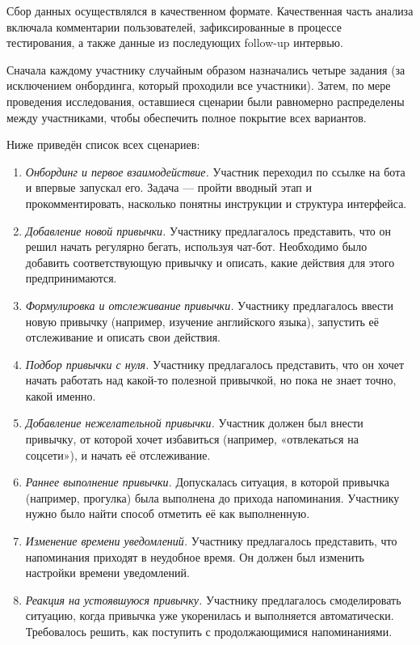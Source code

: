 \documentclass[pdflatex,sn-mathphys-num]{sn-jnl}%
\theoremstyle{thmstyleone}%
\theoremstyle{thmstyletwo}%
\theoremstyle{thmstylethree}%
\begin{document}
Сбор данных осуществлялся в качественном формате. Качественная часть анализа включала комментарии пользователей, зафиксированные в процессе тестирования, а также данные из последующих follow-up интервью.

Сначала каждому участнику случайным образом назначались четыре задания (за исключением онбординга, который проходили все участники). Затем, по мере проведения исследования, оставшиеся сценарии были равномерно распределены между участниками, чтобы обеспечить полное покрытие всех вариантов.

Ниже приведён список всех сценариев:

\begin{enumerate}
    \item \textit{Онбординг и первое взаимодействие.} Участник переходил по ссылке на бота и впервые запускал его. Задача — пройти вводный этап и прокомментировать, насколько понятны инструкции и структура интерфейса.
    \item \textit{Добавление новой привычки.} Участнику предлагалось представить, что он решил начать регулярно бегать, используя чат-бот. Необходимо было добавить соответствующую привычку и описать, какие действия для этого предпринимаются.
    \item \textit{Формулировка и отслеживание привычки.} Участнику предлагалось ввести новую привычку (например, изучение английского языка), запустить её отслеживание и описать свои действия.
    \item \textit{Подбор привычки с нуля.} Участнику предлагалось представить, что он хочет начать работать над какой-то полезной привычкой, но пока не знает точно, какой именно.
    \item \textit{Добавление нежелательной привычки.} Участник должен был внести привычку, от которой хочет избавиться (например, «отвлекаться на соцсети»), и начать её отслеживание.
    \item \textit{Раннее выполнение привычки.} Допускалась ситуация, в которой привычка (например, прогулка) была выполнена до прихода напоминания. Участнику нужно было найти способ отметить её как выполненную.
    \item \textit{Изменение времени уведомлений.} Участнику предлагалось представить, что напоминания приходят в неудобное время. Он должен был изменить настройки времени уведомлений.
    \item \textit{Реакция на устоявшуюся привычку.} Участнику предлагалось смоделировать ситуацию, когда привычка уже укоренилась и выполняется автоматически. Требовалось решить, как поступить с продолжающимися напоминаниями.
\end{enumerate}
\end{document}
